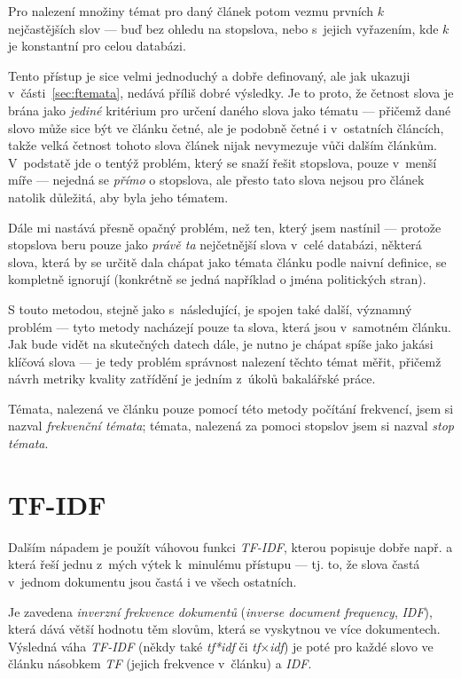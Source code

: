 \documentclass[12pt,a4paper]{report}
\begin{document}
Pro nalezení množiny témat pro daný článek potom vezmu prvních $k$ nej\-ča\-s\-tě\-j\-ších slov --- buď bez ohledu na stopslova, nebo s~jejich vyřazením, kde $k$ je konstantní pro celou databázi.

Tento přístup je sice velmi jednoduchý a dobře definovaný, ale jak ukazuji v~části~\ref{sec:ftemata}, nedává příliš dobré výsledky. Je to proto, že četnost slova je brána jako \emph{jediné} kritérium pro určení daného slova jako tématu --- přičemž dané slovo může sice být ve článku četné, ale je podobně četné i v~ostatních článcích, takže velká četnost tohoto slova článek nijak nevymezuje vůči dalším článkům. V~podstatě jde o tentýž problém, který se snaží řešit stopslova, pouze v~menší míře --- nejedná se \emph{přímo} o stopslova, ale přesto tato slova nejsou pro článek natolik důležitá, aby byla jeho tématem.

Dále mi nastává přesně opačný problém, než ten, který jsem nastínil --- protože stopslova beru pouze jako \emph{právě ta} nejčetnější slova v~celé databázi, některá slova, která by se určitě dala chápat jako témata článku podle naivní definice, se kompletně ignorují (konkrétně se jedná například o jména politických stran).

S touto metodou, stejně jako s~následující, je spojen také další, významný problém --- tyto metody nacházejí pouze ta slova, která jsou v~samotném článku. Jak bude vidět na skutečných datech dále, je nutno je chápat spíše jako jakási klíčová slova --- je tedy problém správnost nalezení těchto témat měřit, přičemž návrh metriky kvality zatřídění je jedním z~úkolů bakalářské práce.

Témata, nalezená ve článku pouze pomocí této metody počítání frekvencí, jsem si nazval \emph{frekvenční témata}; témata, nalezená za pomoci stopslov jsem si nazval \emph{stop témata}.

\section{TF-IDF}
\label{sec:tfidf_teory}
Dalším nápadem je použít váhovou funkci \emph{TF-IDF}, kterou popisuje dobře např. \cite{approaches} a která řeší jednu z~mých výtek k~minulému přístupu --- tj. to, že slova častá v~jednom dokumentu jsou častá i ve všech ostatních.

Je zavedena \emph{inverzní frekvence dokumentů} (\emph{inverse document frequency}, \emph{IDF}), která dává větší hodnotu těm slovům, která se vyskytnou ve více dokumentech. Výsledná váha \emph{TF-IDF} (někdy také \emph{tf*idf} či \emph{tf$\times$idf}) je poté pro každé slovo ve článku násobkem \emph{TF} (jejich  frekvence v~článku) a \emph{IDF}.
\end{document}
